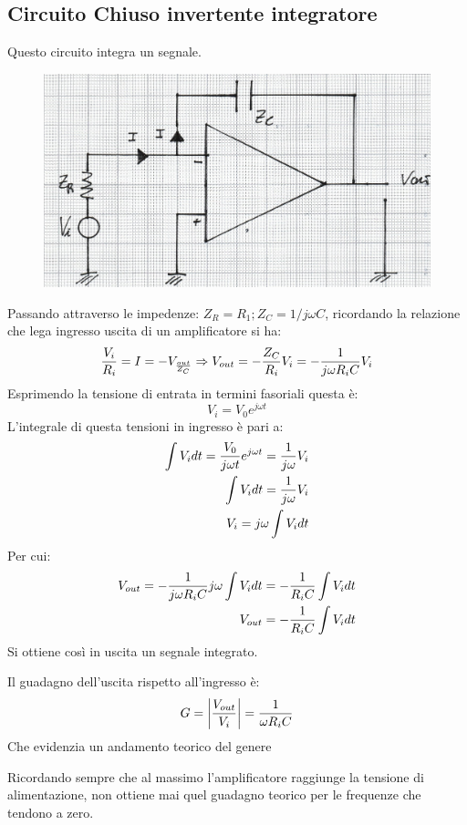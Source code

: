 \documentclass[a4paper, 15pt]{article}
\begin{document}
\subsection{Circuito Chiuso invertente integratore}
\begin{adjustwidth}{2in}{}    		
   		Questo circuito integra un segnale.
\begin{figure}[H]
	\centering
	\includegraphics[width=0.5\linewidth]{immagini/mm(8)}
	\label{fig:mm8}
\end{figure}   		
   		Passando attraverso le impedenze: \(Z_R = R_1; Z_C = {1/j\omega C}\), ricordando la relazione che lega ingresso  uscita di un amplificatore si ha:
   		\[{V_{i}\over R_i} = I = -{V_{out\over Z_C}} \Rightarrow V_{out} = -{Z_C\over R_i}V_i = - {1\over j\omega R_iC}V_i\]
   		Esprimendo la tensione di entrata in termini fasoriali questa è: 
   		\[V_i = V_0e^{j\omega t}\]
   		L'integrale di questa tensioni in ingresso è pari a:
   		\begin{eqnarray*}
   			\int V_idt = {V_0\over j\omega t}e^{j\omega t} = {1\over j\omega}V_i  \\
   			\int V_idt = {1\over j\omega}V_i \\
   			V_i = j\omega\int V_idt
   		\end{eqnarray*}
   		Per cui: 
   		\begin{eqnarray*} 
   			V_{out} = - {1\over j\omega R_iC}j\omega\int V_idt = -{1\over R_iC}\int V_idt \\
   			V_{out} = -{1\over R_iC}\int V_idt
   		\end{eqnarray*}
   		Si ottiene così in uscita un segnale integrato. \newline 
   		
   		Il guadagno dell'uscita rispetto all'ingresso è: 
   		\[ G = \left|V_{out}\over V_i\right| = {1\over\omega R_iC}\]
   		Che evidenzia un andamento teorico del genere
   		\begin{figure}[H]
   			\centering
   		\end{figure}   		
   		Ricordando sempre che al massimo l'amplificatore raggiunge la tensione di alimentazione, non ottiene mai quel guadagno teorico per le frequenze che tendono a zero. \newline 
   		

\end{adjustwidth}
\end{document}

